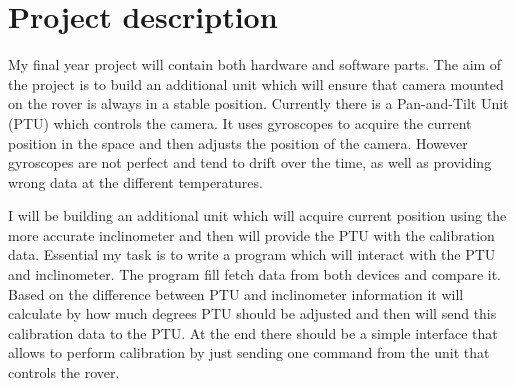 \documentclass[11pt,fleqn,twoside]{article}
\begin{document}
\wordcount{}

\mmp

\setcounter{tocdepth}{3} %


\section{Project description}

My final year project will contain both hardware and software parts. The aim of the project is to build an additional unit which will ensure that camera mounted on the rover is always in a stable position. Currently there is a Pan-and-Tilt Unit (PTU) which controls the camera. It uses gyroscopes to acquire the current position in the space and then adjusts the position of the camera. However gyroscopes are not perfect and tend to drift over the time, as well as providing wrong data at the different temperatures. 

I will be building an additional unit which will acquire current position using the more accurate inclinometer and then will provide the PTU with the calibration data. Essential my task is to write a program which will interact with the PTU and inclinometer. The program fill fetch data from both devices and compare it. Based on the difference between PTU and inclinometer information it will calculate by how much degrees PTU should be adjusted and then will send this calibration data to the PTU. At the end there should be a simple interface that allows to perform calibration by just sending one command from the unit that controls the rover.    
\end{document}
